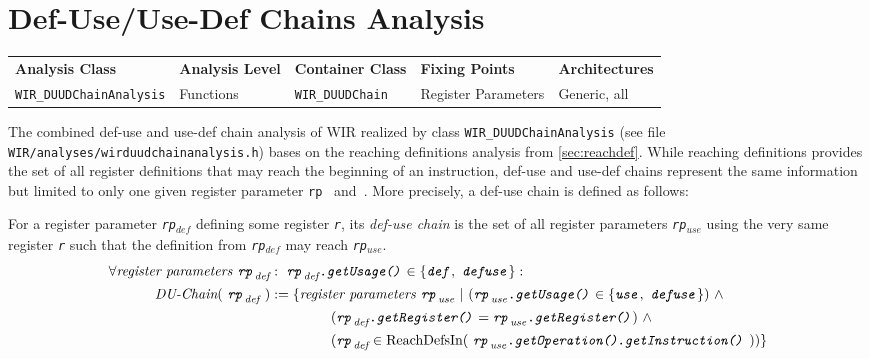 \section{Def-Use/Use-Def Chains Analysis}
\label{sec:duudchains}

\begin{tabular}{|l|l|l|l|l|}
  \hline
  \textbf{Analysis Class} & \textbf{Analysis Level} & \textbf{Container Class} & \textbf{Fixing Points} & \textbf{Architectures} \\
  \hhline{|=|=|=|=|=|}
  \texttt{\small WIR\_DUUDChainAnalysis} & Functions & \texttt{\small WIR\_DUUDChain} & Register Parameters & Generic, all \\
  \hline
\end{tabular}

The combined def-use and use-def chain analysis of \gls{WIR} realized by class \texttt{WIR\_DUUDChainAnalysis} (see file \texttt{WIR/analyses/wirduudchainanalysis.h}) bases on the reaching definitions analysis from \cref{sec:reachdef}.
While reaching definitions provides the set of all register definitions that may reach the beginning of an instruction, def-use and use-def chains represent the same information but limited to only one given register parameter \texttt{rp}~\cite[chapter~17.4]{Appel04} and~\cite[chapter~8.10]{Much97}.
More precisely, a def-use chain is defined as follows:

\begin{definition} \label{def:duchain}
  For a register parameter \texttt{\emph{rp}}$_\textit{def}$ defining some register \texttt{\emph r}, its \emph{def-use chain} is the set of all register parameters \texttt{\emph{rp}}$_\textit{use}$ using the very same register \texttt{\emph r} such that the definition from \texttt{\emph{rp}}$_\textit{def}$ may reach \texttt{\emph{rp}}$_\textit{use}$.
  \begin{align}
    \forall\text{\emph{register parameters}\ }\texttt{\emph{rp}}_\textit{def}&:\ \texttt{\emph{rp}}_\textit{def}\texttt{\emph{.getUsage()}} \in \{ \texttt{\emph{def}},\ \texttt{\emph{defuse}}\}:\nonumber \\
    \textit{DU-Chain}(\ \texttt{\emph{rp}}_\textit{def}\ ) &:= \{ \text{\emph{register parameters}\ }\texttt{\emph{rp}}_\textit{use}\ \vert\ (\texttt{\emph{rp}}_\textit{use}\texttt{\emph{.getUsage()}} \in \{ \texttt{\emph{use}},\ \texttt{\emph{defuse}}\})\ \wedge\label{eq:duchain} \\
    & \ \ \ \ \ \ \ \ \ \ \ \ \ (\texttt{\emph{rp}}_\textit{def}\texttt{\emph{.getRegister()}} = \texttt{\emph{rp}}_\textit{use}\texttt{\emph{.getRegister()}})\ \wedge\nonumber \\
    & \ \ \ \ \ \ \ \ \ \ \ \ \ (\texttt{\emph{rp}}_\textit{def} \in \text{ReachDefsIn}(\ \texttt{\emph{rp}}_\textit{use}\texttt{\emph{.getOperation().getInstruction()}}\ ))\}\nonumber
  \end{align}
\end{definition}

